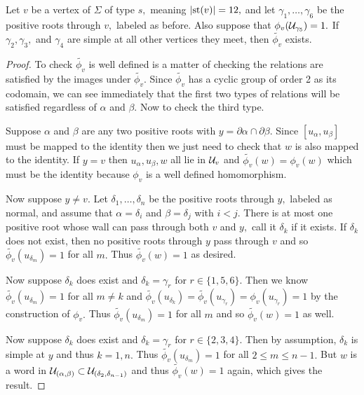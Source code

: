 \documentclass[class=book, crop=false]{standalone}
\begin{document}
\begin{lemma} Let $v$ be a vertex of $\Sigma$ of type $s,$ meaning $|\mathrm{st}(v)|=12,$ and let $\gamma_1,\dots,\gamma_6$ be the positive roots through $v,$ labeled as before. Also suppose that $\phi_v(\mathcal{U}_{\gamma_5})=1.$ If $\gamma_2,\gamma_3,$ and $\gamma_4$ are simple at all other vertices they meet, then $\tilde{\phi_v}$ exists.
	\label{336f2existence}
\end{lemma}
\begin{proof}
	To check $\tilde{\phi_v}$ is well defined is a matter of checking the relations are satisfied by the images under $\tilde{\phi_v}.$ Since $\tilde{\phi_v}$ has a cyclic group of order 2 as its codomain, we can see immediately that the first two types of relations will be satisfied regardless of $\alpha$ and $\beta.$ Now to check the third type.

	Suppose $\alpha$ and $\beta$ are any two positive roots with $y=\partial\alpha\cap \partial\beta.$ Since $[u_\alpha,u_\beta]$ must be mapped to the identity then we just need to check that $w$ is also mapped to the identity. If $y=v$ then $u_\alpha,u_\beta,w$ all lie in $\mathcal{U}_v$ and $\tilde{\phi_v}(w)=\phi_v(w)$ which must be the identity because $\phi_v$ is a well defined homomorphism.

	Now suppose $y\neq v.$ Let $\delta_1,\dots,\delta_n$ be the positive roots through $y,$ labeled as normal, and assume that $\alpha=\delta_i$ and $\beta=\delta_j$ with $i<j.$ There is at most one positive root whose wall can pass through both $v$ and $y,$ call it $\delta_k$ if it exists. If $\delta_k$ does not exist, then no positive roots through $y$ pass through $v$ and so $\tilde{\phi_v}(u_{\delta_m})=1$ for all $m.$ Thus $\tilde{\phi_v}(w)=1$ as desired.

	Now suppose $\delta_k$ does exist and $\delta_k=\gamma_r$ for $r\in \{1,5,6\}.$ Then we know $\tilde{\phi_v}(u_{\delta_m})=1$ for all  $m\neq k$ and $\tilde{\phi_v}(u_{\delta_k})=\tilde{\phi_v}(u_{\gamma_r})=\phi_v(u_{\gamma_r})=1$ by the construction of $\phi_v.$ Thus $\tilde{\phi_v}(u_{\delta_m})=1$ for all $m$ and so $\tilde{\phi_v}(w)=1$ as well.

	Now suppose $\delta_k$ does exist and $\delta_k=\gamma_r$ for $r\in \{2,3,4\}.$ Then by assumption, $\delta_k$ is simple at $y$ and thus $k=1,n.$ Thus $\tilde{\phi_v}(u_{\delta_m})=1$ for all $2\le m\le n-1.$ But $w$ is a word in $\mathcal{U}_{(\alpha,\beta)}\subset \mathcal{U}_{(\delta_2,\delta_{n-1})}$ and thus $\tilde{\phi_v}(w)=1$ again, which gives the result.
\end{proof}
\end{document}
